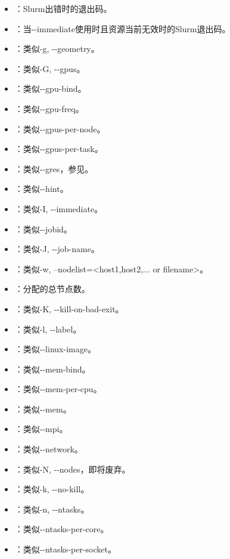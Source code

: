 \begin{itemize}
	\item {}：Slurm出错时的退出码。
	\item {}：当-{}-immediate使用时且资源当前无效时的Slurm退出码。
	\item {}：类似-g, -{}-geometry。
	\item {}：类似-G, -{}-gpus。
	\item {}：类似-{}-gpu-bind。
	\item {}：类似-{}-gpu-freq。
	\item {}：类似-{}-gpus-per-node。
	\item {}：类似-{}-gpus-per-task。
	\item {}：类似-{}-gres，参见。
	\item {}：类似-{}-hint。
	\item {}：类似-I, -{}-immediate。
	\item {}：类似-{}-jobid。
	\item {}：类似-J, -{}-job-name。
	\item {}：类似-w, --nodelist=<host1,host2,... or filename>。
	\item {}：分配的总节点数。
	\item {}：类似-K, -{}-kill-on-bad-exit。
	\item {}：类似-l, -{}-label。
	\item {}：类似-{}-linux-image。
	\item {}：类似-{}-mem-bind。
	\item {}：类似-{}-mem-per-cpu。
	\item {}：类似-{}-mem。
	\item {}：类似-{}-mpi。
	\item {}：类似-{}-network。
	\item {}：类似-N, -{}-nodes，即将废弃。
	\item {}：类似-k, -{}-no-kill。
	\item {}：类似-n, -{}-ntasks。
	\item {}：类似-{}-ntasks-per-core。
	\item {}：类似-{}-ntasks-per-socket。

\end{itemize}
